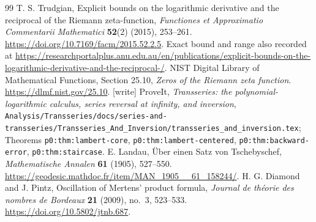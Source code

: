 \documentclass[11pt]{article}
\theoremstyle{remark}\newtheorem{remark}[theorem]{Remark}
\numberwithin{equation}{section}
\begin{document}
\begin{thebibliography}{99}
 T. S. Trudgian, Explicit bounds on the logarithmic derivative and the reciprocal of the Riemann zeta-function, \emph{Functiones et Approximatio Commentarii Mathematici} \textbf{52}(2) (2015), 253--261. \url{https://doi.org/10.7169/facm/2015.52.2.5}. Exact bound and range also recorded at \url{https://researchportalplus.anu.edu.au/en/publications/explicit-bounds-on-the-logarithmic-derivative-and-the-reciprocal-/}.
 NIST Digital Library of Mathematical Functions, Section 25.10, \emph{Zeros of the Riemann zeta function}. \url{https://dlmf.nist.gov/25.10}.
 [write] ProveIt, \emph{Transseries: the polynomial-logarithmic calculus, series reversal at infinity, and inversion}, \texttt{Analysis/\allowbreak Transseries/\allowbreak docs/\allowbreak series-and-transseries/\allowbreak Transseries\_And\_Inversion/\allowbreak transseries\_and\_inversion.tex}; Theorems \texttt{p0:thm:lambert-core}, \texttt{p0:thm:lambert-centered}, \texttt{p0:thm:backward-error}, \texttt{p0:thm:staircase}.
E. Landau, \"Uber einen Satz von Tschebyschef,
\emph{Mathematische Annalen} \textbf{61} (1905), 527--550.
\url{https://geodesic.mathdoc.fr/item/MAN_1905__61_158244/}.
H. G. Diamond and J. Pintz, Oscillation of Mertens' product formula,
\emph{Journal de th\'eorie des nombres de Bordeaux}
\textbf{21} (2009), no.~3, 523--533.
\url{https://doi.org/10.5802/jtnb.687}.
\end{thebibliography}
\end{document}
